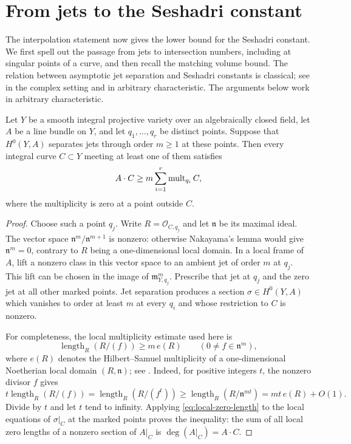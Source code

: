 \section{From jets to the Seshadri constant}\label{sec:positivity}

The interpolation statement now gives the lower bound for the Seshadri
constant.  We first spell out the passage from jets to intersection numbers,
including at singular points of a curve, and then recall the matching volume
bound.  The relation between asymptotic jet separation and Seshadri constants
is classical; see \cite[Theorem~6.4]{Demailly1992} in the complex setting
and \cite[Section~2, Equation~(2.3)]{MustataSchwede2014} in arbitrary
characteristic.
The arguments below work in arbitrary characteristic.

\begin{lemma}\label{lem:jet-curve-bound}
Let $Y$ be a smooth integral projective variety over an algebraically closed
field, let $A$ be a line bundle on $Y$, and let $q_1,\ldots,q_r$ be distinct
points.  Suppose that $H^0(Y,A)$ separates jets through order $m\geq 1$ at
these points.  Then every integral curve $C\subset Y$ meeting at least one
of them satisfies
\[
 A\cdot C\geq m\sum_{i=1}^r\operatorname{mult}_{q_i}C,
\]
where the multiplicity is zero at a point outside $C$.
\end{lemma}

\begin{proof}
Choose such a point $q_j$.  Write $R=\mathcal O_{C,q_j}$ and let $\mathfrak n$
be its maximal ideal.  The vector space
$\mathfrak n^m/\mathfrak n^{m+1}$ is nonzero: otherwise Nakayama's lemma would
give $\mathfrak n^m=0$, contrary to $R$ being a one-dimensional local domain.
In a local frame of $A$, lift a nonzero class in this vector space to an
ambient jet of order $m$ at $q_j$.  This lift can be chosen in the image of
$\mathfrak m_{Y,q_j}^m$.  Prescribe that jet at $q_j$ and the zero jet at all
other marked points.  Jet separation produces a section $\sigma\in H^0(Y,A)$
which vanishes to order at least $m$ at every $q_i$ and whose restriction to
$C$ is nonzero.

For completeness, the local multiplicity estimate used here is
\begin{equation}\label{eq:local-zero-length}
 \operatorname{length}_R(R/(f))\geq m\,e(R)
 \qquad(0\ne f\in\mathfrak n^m),
\end{equation}
where $e(R)$ denotes the Hilbert--Samuel multiplicity of a one-dimensional
Noetherian local domain $(R,\mathfrak n)$; see
\cite[Definition~43.15.1, Tag~0AZV]{StacksProject}.  Indeed, for positive integers $t$,
the nonzero divisor $f$ gives
\[
 t\operatorname{length}_R(R/(f))
 =\operatorname{length}_R(R/(f^t))
 \geq\operatorname{length}_R(R/\mathfrak n^{mt})
 =mt\,e(R)+O(1).
\]
Divide by $t$ and let $t$ tend to infinity.  Applying
\eqref{eq:local-zero-length} to the local equations of $\sigma|_C$ at the
marked points proves the inequality: the sum of all local zero lengths of a
nonzero section of $A|_C$ is $\deg(A|_C)=A\cdot C$.
\end{proof}

